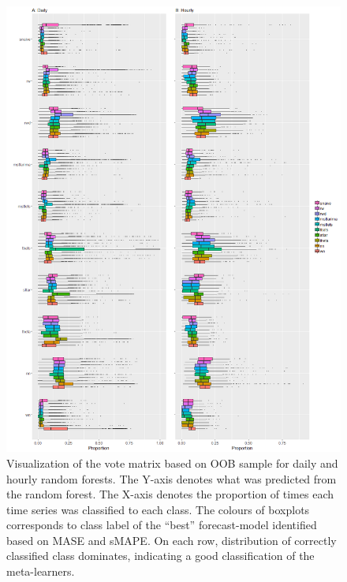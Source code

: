 \documentclass[11pt,a4paper,]{article}
\begin{document}
\begin{figure}
\centering
\includegraphics{figures/oobdailyhourly-1.png}
\caption{\label{fig:oobdailyhourly}Visualization of the vote matrix based on
OOB sample for daily and hourly random forests. The Y-axis denotes what
was predicted from the random forest. The X-axis denotes the proportion
of times each time series was classified to each class. The colours of
boxplots corresponds to class label of the ``best'' forecast-model
identified based on MASE and sMAPE. On each row, distribution of
correctly classified class dominates, indicating a good classification
of the meta-learners.}
\end{figure}

\newpage
\end{document}
